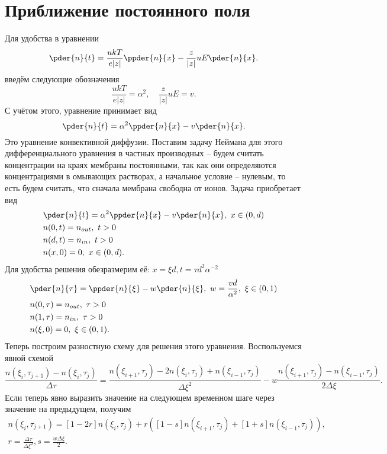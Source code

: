 \documentclass{hedwork}
\begin{document}
\section{Приближение постоянного поля}
            Для удобства в уравнении
            \[
                \pder{n}{t} = \frac{ukT}{e|z|}\ppder{n}{x} -
                    \frac{z}{|z|}uE\pder{n}{x}.
            \]
            введём следующие обозначения
            \[
                \frac{ukT}{e|z|} = \alpha^2,\quad \frac{z}{|z|}uE = v.
            \]
            С учётом этого, уравнение принимает вид
            \[
                \pder{n}{t} = \alpha^2\ppder{n}{x} - v\pder{n}{x}.
            \]
            Это уравнение конвективной диффузии. Поставим задачу Неймана для
            этого дифференциального уравнения в частных производных -- будем
            считать концентрации на краях мембраны постоянными, так как они
            определяются концентрациями в омывающих растворах, а начальное
            условие -- нулевым, то есть будем считать, что сначала мембрана
            свободна от ионов. Задача приобретает вид
            \begin{align*}
                & \pder{n}{t} = \alpha^2\ppder{n}{x} - v\pder{n}{x},\ x\in(0,d)\\
                & n(0, t) = n_{out},\ t>0 \\
                & n(d, t) = n_{in},\ t>0 \\
                & n(x, 0) = 0,\ x\in(0,d).
            \end{align*}
            Для удобства решения обезразмерим её:
            \( x = \xi d, t = \tau d^2 \alpha^{-2} \)
            \begin{align*}
                & \pder{n}{\tau} = \ppder{n}{\xi} -
                    w\pder{n}{\xi},\ w = \frac{vd}{\alpha^2},\ \xi\in(0,1) \\
                & n(0, \tau) = n_{out},\ \tau>0 \\
                & n(1, \tau) = n_{in},\ \tau>0 \\
                & n(\xi, 0) = 0,\ \xi\in(0,1).
            \end{align*}
            Теперь построим разностную схему для решения этого уравнения.
            Воспользуемся явной схемой
            \[
                \frac{n(\xi_i,\tau_{j+1}) - n(\xi_i, \tau_j)}{\Delta\tau} =
                \frac{n(\xi_{i+1},\tau_j) - 2n(\xi_i, \tau_j) +
                n(\xi_{i-1},\tau_j)}{\Delta\xi^2} -
                w\frac{n(\xi_{i+1},\tau_j) - n(\xi_{i-1}, \tau_j)}{2\Delta\xi}.
            \]
            Если теперь явно выразить значение на следующем временном шаге через
            значение на предыдущем, получим
            \begin{gather*}
                n(\xi_i,\tau_{j+1}) =
                [1-2r]n(\xi_i, \tau_j) +
                r\left(
                    [1 - s]n(\xi_{i+1},\tau_j) + [1 + s]n(\xi_{i-1},\tau_j)
                \right),\\
                r = \frac{\Delta\tau}{\Delta\xi^2}, s = \frac{w\Delta\xi}{2}.
            \end{gather*}
\end{document}
